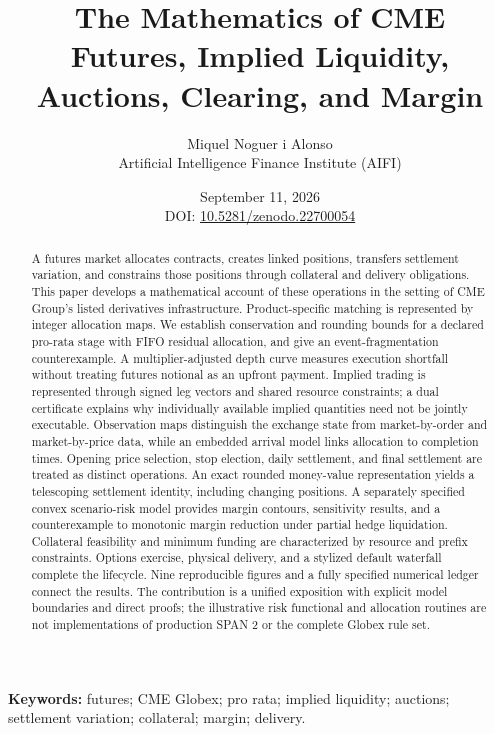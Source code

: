 \documentclass[11pt,letterpaper]{article}
\title{\textbf{The Mathematics of CME}\\[5pt]
\large Futures, Implied Liquidity, Auctions, Clearing, and Margin}
\author{Miquel Noguer i Alonso\\[2pt]
 \small Artificial Intelligence Finance Institute (AIFI)}
\date{September 11, 2026\\[4pt]
\small DOI: \href{https://doi.org/10.5281/zenodo.22700054}{10.5281/zenodo.22700054}}
\numberwithin{equation}{section}
\theoremstyle{definition}
\theoremstyle{remark}
\begin{document}
\maketitle
\begin{abstract}
A futures market allocates contracts, creates linked positions, transfers settlement variation, and constrains those positions through collateral and delivery obligations. This paper develops a mathematical account of these operations in the setting of CME Group's listed derivatives infrastructure. Product-specific matching is represented by integer allocation maps. We establish conservation and rounding bounds for a declared pro-rata stage with FIFO residual allocation, and give an event-fragmentation counterexample. A multiplier-adjusted depth curve measures execution shortfall without treating futures notional as an upfront payment. Implied trading is represented through signed leg vectors and shared resource constraints; a dual certificate explains why individually available implied quantities need not be jointly executable. Observation maps distinguish the exchange state from market-by-order and market-by-price data, while an embedded arrival model links allocation to completion times. Opening price selection, stop election, daily settlement, and final settlement are treated as distinct operations. An exact rounded money-value representation yields a telescoping settlement identity, including changing positions. A separately specified convex scenario-risk model provides margin contours, sensitivity results, and a counterexample to monotonic margin reduction under partial hedge liquidation. Collateral feasibility and minimum funding are characterized by resource and prefix constraints. Options exercise, physical delivery, and a stylized default waterfall complete the lifecycle. Nine reproducible figures and a fully specified numerical ledger connect the results. The contribution is a unified exposition with explicit model boundaries and direct proofs; the illustrative risk functional and allocation routines are not implementations of production SPAN 2 or the complete Globex rule set.
\end{abstract}
\noindent\textbf{Keywords:} futures; CME Globex; pro rata; implied liquidity; auctions; settlement variation; collateral; margin; delivery.
\clearpage
\tableofcontents
\clearpage

\clearpage












\FloatBarrier
\clearpage
\begingroup\small


\endgroup
\appendix

\end{document}
